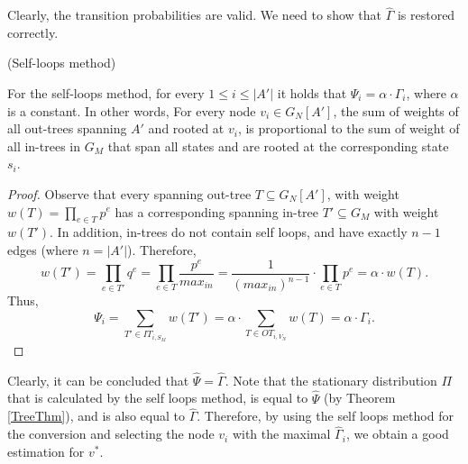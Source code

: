 \documentclass[sigconf,anonymous]{aamas}
\begin{document}






Clearly, the transition probabilities are valid. We need to show that $\hat{\Gamma}$ is restored correctly. 


\begin{theorem}
\label{SelfLoop}
(Self-loops method)

For the self-loops method, for every $1\leq i \leq |A'|$ it holds that $\Psi_i =\alpha \cdot \Gamma_i$,
where $\alpha$ is a constant.
In other words, For every node $v_i\in G_N[A']$, the sum of weights of all out-trees spanning $A'$ and rooted at $v_i$,
is proportional to the sum of weight of all in-trees in $G_M$ that span all states and are rooted at the corresponding state $s_i$. 
\end{theorem}
\begin{proof}
Observe that every spanning out-tree $T \subseteq G_N[A']$, with weight $w(T)=\prod_{e\in T}p^e$ has a corresponding spanning in-tree $T' \subseteq G_M$ with weight $w(T')$. In addition,
in-trees do not contain self loops, and have exactly $n-1$ edges (where $n=|A'|$). Therefore,
\[
 w(T')=\prod_{e\in T'}q^e = \prod_{e\in T}\frac{p^e}{max_{in}} =\frac{1}{(max_{in})^{n-1}}\cdot \prod_{e\in T}p^e 
=\alpha \cdot w(T).
\]
Thus,
\[
\Psi_i = \sum_{T'\in IT_{i,S_M}}w(T')
 = \alpha \cdot \sum_{T\in OT_{i,V_N}} w(T)=\alpha \cdot \Gamma_i.
\]
\end{proof}

Clearly, it can be concluded that $\hat{\Psi} = \hat{\Gamma}$.
Note that the stationary distribution $\Pi$ that is calculated by the self loops method, is equal to $\hat{\Psi}$ (by Theorem \ref{TreeThm}), and is also equal to $\hat{\Gamma}$. Therefore, by using the self loops method for the conversion and selecting the node $v_i$ with the maximal $\hat{\Gamma}_i$, we obtain a good estimation for $v^*$. 
\end{document}
